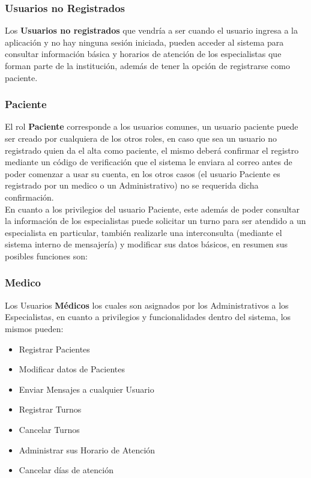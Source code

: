 \subsubsection{Usuarios no Registrados}

Los \textbf{Usuarios no registrados} que vendría a ser cuando el usuario ingresa a la aplicación y no hay ninguna sesión iniciada, pueden acceder al sistema para consultar información básica y horarios de atención de los especialistas que forman parte de la institución, además de tener la opción de registrarse como paciente.\\[0.1cm]    

\subsubsection{Paciente}

El rol \textbf{Paciente} corresponde a los usuarios comunes, un usuario paciente puede ser creado por cualquiera de los otros roles, en caso que sea un usuario no registrado quien da el alta como paciente, el mismo deberá confirmar el registro mediante un código de verificación que el sistema le enviara al correo antes de poder comenzar a usar su cuenta, en los otros casos (el usuario Paciente es registrado por un 
medico o un Administrativo) no se requerida dicha confirmación.\\[0.1cm]

En cuanto a los privilegios del usuario Paciente, este además de poder consultar la  información de los especialistas puede solicitar un turno para ser atendido a un especialista en particular, también realizarle una interconsulta (mediante el sistema interno de mensajería) y modificar sus datos básicos, en resumen sus posibles funciones son:


\subsubsection{Medico}

Los Usuarios \textbf{Médicos} los cuales son asignados por los Administrativos a los Especialistas, en cuanto a privilegios y funcionalidades dentro del sistema, los mismos pueden:

\begin{itemize}
    \item Registrar Pacientes
    \item Modificar datos de Pacientes
    \item Enviar Mensajes a cualquier Usuario
    \item Registrar Turnos 
    \item Cancelar Turnos
    \item Administrar sus Horario de Atención
    \item Cancelar días de atención
\end{itemize}

